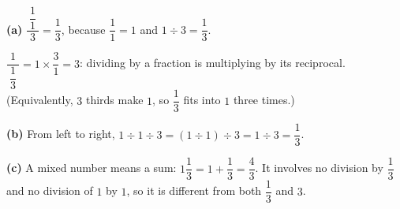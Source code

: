 \textbf{(a)} $\dfrac{\ \dfrac11\ }{3}=\dfrac{1}{3}$, because $\dfrac11=1$ and $1\div3=\dfrac13$.

$\dfrac{1}{\ \dfrac13\ }=1\times\dfrac31=3$: dividing by a fraction is multiplying by its reciprocal. (Equivalently, $3$ thirds make $1$, so $\dfrac13$ fits into $1$ three times.)

\textbf{(b)} From left to right, $1\div1\div3=(1\div1)\div3=1\div3=\boxed{\dfrac13}$.

\textbf{(c)} A mixed number means a sum: $1\dfrac13=1+\dfrac13=\boxed{\dfrac43}$. It involves no division by $\dfrac13$ and no division of $1$ by $1$, so it is different from both $\dfrac13$ and $3$.
